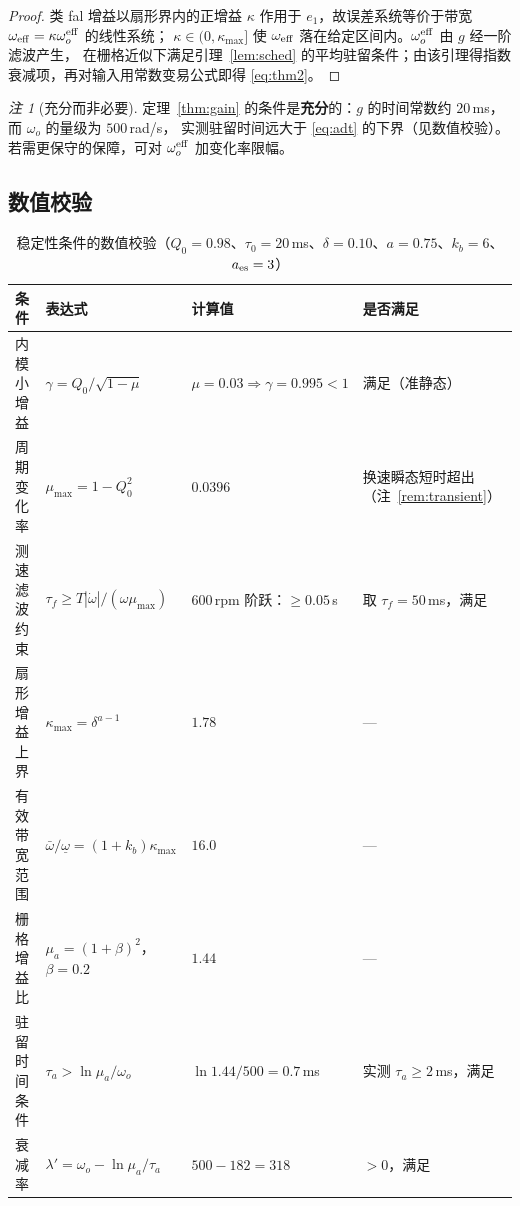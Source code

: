 \documentclass[11pt,a4paper]{article}
\theoremstyle{remark}
\newtheorem{remark}{注}
\begin{document}
\begin{proof}
类 fal 增益以扇形界内的正增益 $\kappa$ 作用于 $e_1$，故误差系统等价于带宽 $\omega_{\rm eff}=\kappa\omega_o^{\rm eff}$ 的线性系统；
$\kappa\in(0,\kappa_{\max}]$ 使 $\omega_{\rm eff}$ 落在给定区间内。$\omega_o^{\rm eff}$ 由 $g$ 经一阶滤波产生，
在栅格近似下满足引理~\ref{lem:sched} 的平均驻留条件；由该引理得指数衰减项，再对输入用常数变易公式即得 \eqref{eq:thm2}。
\end{proof}
\begin{remark}[充分而非必要]\label{rem:suff}
定理~\ref{thm:gain} 的条件是\textbf{充分}的：$g$ 的时间常数约 $20$\,ms，而 $\omega_o$ 的量级为 $500$\,rad/s，
实测驻留时间远大于 \eqref{eq:adt} 的下界（见数值校验）。若需更保守的保障，可对 $\omega_o^{\rm eff}$ 加变化率限幅。
\end{remark}

\subsection{数值校验}\label{app:num}
\begin{table}[htbp]
\centering
\footnotesize
\caption{稳定性条件的数值校验（$Q_0=0.98$、$\tau_0=20$\,ms、$\delta=0.10$、$a=0.75$、$k_b=6$、$a_{\rm es}=3$）}
\begin{tabular}{@{}llll@{}}
\toprule
条件 & 表达式 & 计算值 & 是否满足\\
\midrule
内模小增益 & $\gamma=Q_0/\sqrt{1-\mu}$ & $\mu=0.03\Rightarrow\gamma=0.995<1$ & 满足（准静态）\\
周期变化率 & $\mu_{\max}=1-Q_0^{2}$ & $0.0396$ & 换速瞬态短时超出（注~\ref{rem:transient}）\\
测速滤波约束 & $\tau_f\ge T|\dot\omega|/(\omega\mu_{\max})$ & $600$\,rpm 阶跃：$\ge0.05$\,s & 取 $\tau_f=50$\,ms，满足\\
扇形增益上界 & $\kappa_{\max}=\delta^{a-1}$ & $1.78$ & ---\\
有效带宽范围 & $\bar\omega/\underline\omega=(1+k_b)\kappa_{\max}$ & $16.0$ & ---\\
栅格增益比 & $\mu_a=(1+\beta)^{2}$，$\beta=0.2$ & $1.44$ & ---\\
驻留时间条件 & $\tau_a>\ln\mu_a/\omega_o$ & $\ln1.44/500=0.7$\,ms & 实测 $\tau_a\ge2$\,ms，满足\\
衰减率 & $\lambda'=\omega_o-\ln\mu_a/\tau_a$ & $500-182=318$ & $>0$，满足\\
\bottomrule
\end{tabular}
\end{table}
\end{document}
